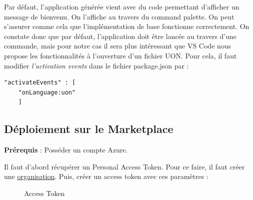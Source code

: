 \documentclass[
    iict, %
    il, %
]{heig-tb}
\begin{document}
Par défaut, l'application générée vient avec du code permettant d'afficher un message de bienvenu. On l'affiche au travers du command palette. On peut s'assurer comme cela que l'implémentation de base fonctionne correctement.
On constate donc que par défaut, l'application doit être lancée au travers d'une commande, mais pour notre cas il sera plus intéressant que VS Code nous propose les fonctionnalités à l'ouverture d'un fichier UON.
Pour cela, il faut modifier \emph{l'activation events} dans le fichier package.json par :
\begin{lstlisting}[frame=single]
    "activateEvents" : [
	"onLanguage:uon"
    ]
\end{lstlisting}

\subsection{Déploiement sur le Marketplace}




\textbf{Prérequis} : Posséder un compte Azure.

Il faut d'abord récupérer un Personal Access Token. Pour ce faire, il faut créer une \href{https://docs.microsoft.com/en-us/azure/devops/organizations/accounts/create-organization?view=azure-devops}{organisation}.
Puis, créer un access token avec ces paramètres :
\begin{figure}[!h]
    \begin{center}
    \end{center}
    \caption[Access Token]{\label{access-token}Access Token}
\end{figure}
\end{document}
